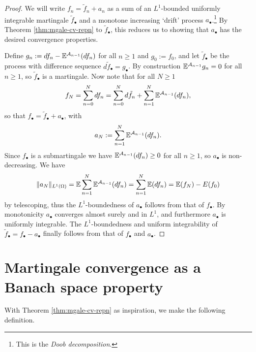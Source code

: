 \begin{proof}
  We will write $f_{n} = \tilde{f}_{n} + a_{n}$ as a sum of an $L^1$-bounded uniformly integrable martingale $\tilde{f}_{\bullet}$ and a monotone increasing `drift' process $a_{\bullet}$.\footnote{This is the \emph{Doob decomposition}.}
  By Theorem \ref{thm:mgale-cv-repn} to $\tilde{f}_{\bullet}$, this reduces us to showing that $a_{\bullet}$ has the desired convergence properties.

  Define $g_{n} := df_{n} - \mathbb{E}^{\mathcal{A}_{n-1}}(df_{n})$ for all $n \geq 1$ and $g_{0} := f_{0}$, and let $\tilde{f}_{\bullet}$ be the process with difference sequence $d\tilde{f}_{\bullet} = g_{\bullet}$.
  By construction $\mathbb{E}^{\mathcal{A}_{n-1}} g_{n} = 0$ for all $n \geq 1$, so $\tilde{f}_{\bullet}$ is a martingale.
  Now note that for all $N \geq 1$
  \begin{equation*}
    f_{N} = \sum_{n=0}^{N} df_{n} = \sum_{n=0}^{N} d\tilde{f}_{n} + \sum_{n=1}^{N} \mathbb{E}^{\mathcal{A}_{n-1}}(df_{n}),
  \end{equation*}
  so that $f_{\bullet} = \tilde{f}_{\bullet} + a_{\bullet}$, with
  \begin{equation*}
    a_{N} := \sum_{n=1}^{N} \mathbb{E}^{\mathcal{A}_{n-1}}(df_{n}). 
  \end{equation*}
  Since $f_{\bullet}$ is a submartingale we have $\mathbb{E}^{\mathcal{A}_{n-1}}(df_{n}) \geq 0$ for all $n \geq 1$, so $a_{\bullet}$ is non-decreasing.
  We have
  \begin{equation*}
    \|a_{N}\|_{L^1(\Omega)} = \mathbb{E} \sum_{n=1}^{N} \mathbb{E}^{\mathcal{A}_{n-1}}(df_{n}) = \sum_{n=1}^{N} \mathbb{E}(df_{n}) = \mathbb{E}(f_{N}) - E(f_{0})
  \end{equation*}
  by telescoping, thus the $L^1$-boundedness of $a_{\bullet}$ follows from that of $f_{\bullet}$.
  By monotonicity $a_{\bullet}$ converges almost surely and in $L^1$, and furthermore $a_{\bullet}$ is uniformly integrable.
  The $L^1$-boundedness and uniform integrability of $\tilde{f}_{\bullet} = f_{\bullet} - a_{\bullet}$ finally follows from that of $f_{\bullet}$ and $a_{\bullet}$.
  
\end{proof}

\section{Martingale convergence as a Banach space property}


With Theorem \ref{thm:mgale-cv-repn} as inspiration, we make the following definition.

